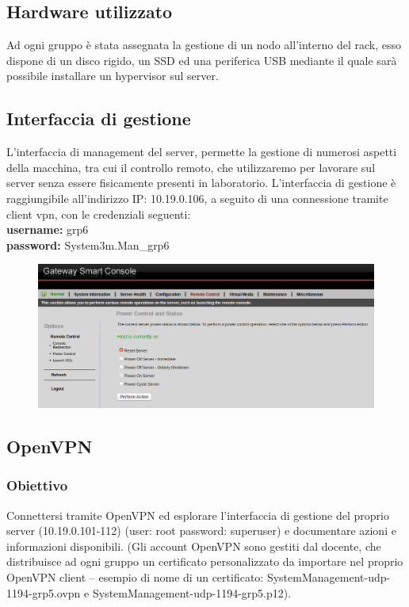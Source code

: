 \documentclass{article}
\begin{document}
\subsection{Hardware utilizzato}
Ad ogni gruppo è stata assegnata la gestione di un nodo all'interno del rack, esso dispone di un disco rigido, un SSD ed una periferica USB mediante il quale sarà possibile installare un hypervisor sul server.

\subsection{Interfaccia di gestione}
L'interfaccia di management del server, permette la gestione di numerosi aspetti della macchina, tra cui il controllo remoto, che utilizzaremo per lavorare sul server senza essere fisicamente presenti in laboratorio.
L'interfaccia di gestione è raggiungibile all'indirizzo IP: 10.19.0.106, a seguito di una connessione tramite client vpn, con le credenziali seguenti: \\  \textbf{username:} grp6 \\ \textbf{password:} System3m.Man\_grp6
\begin{figure}[H]
    \center
    \includegraphics[scale=0.37]{images/GUIManagement.png}
\end{figure}

\subsection{OpenVPN}
\subsubsection{Obiettivo}
Connettersi tramite OpenVPN ed esplorare l’interfaccia di gestione del proprio
server (10.19.0.101-112) (user: root password: superuser) e documentare
azioni e informazioni disponibili.
(Gli account OpenVPN sono gestiti dal docente, che distribuisce ad ogni gruppo
un certificato personalizzato da importare nel proprio OpenVPN client – esempio
di nome di un certificato: SystemManagement-udp-1194-grp5.ovpn e
SystemManagement-udp-1194-grp5.p12).
\end{document}
